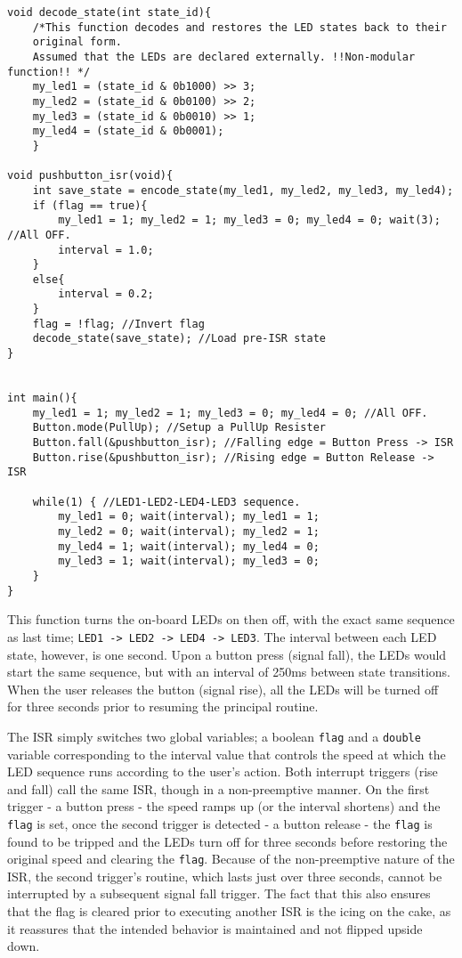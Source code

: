 \documentclass{article}
\begin{document}
\begin{verbatim}
void decode_state(int state_id){
    /*This function decodes and restores the LED states back to their
    original form.
    Assumed that the LEDs are declared externally. !!Non-modular function!! */
    my_led1 = (state_id & 0b1000) >> 3;
    my_led2 = (state_id & 0b0100) >> 2;
    my_led3 = (state_id & 0b0010) >> 1;
    my_led4 = (state_id & 0b0001);
    }

void pushbutton_isr(void){
    int save_state = encode_state(my_led1, my_led2, my_led3, my_led4);
    if (flag == true){
        my_led1 = 1; my_led2 = 1; my_led3 = 0; my_led4 = 0; wait(3); //All OFF.
        interval = 1.0;
    }
    else{
        interval = 0.2;
    }
    flag = !flag; //Invert flag
    decode_state(save_state); //Load pre-ISR state
}


int main(){
    my_led1 = 1; my_led2 = 1; my_led3 = 0; my_led4 = 0; //All OFF.
    Button.mode(PullUp); //Setup a PullUp Resister
    Button.fall(&pushbutton_isr); //Falling edge = Button Press -> ISR
    Button.rise(&pushbutton_isr); //Rising edge = Button Release -> ISR
    
    while(1) { //LED1-LED2-LED4-LED3 sequence.
        my_led1 = 0; wait(interval); my_led1 = 1;
        my_led2 = 0; wait(interval); my_led2 = 1;
        my_led4 = 1; wait(interval); my_led4 = 0;
        my_led3 = 1; wait(interval); my_led3 = 0;
    }
}
\end{verbatim}

This function turns the on-board LEDs on then off, with the exact same sequence as last time; \texttt{LED1 -> LED2 -> LED4 -> LED3}. The interval between each LED state, however, is one second. Upon a button press (signal fall), the LEDs would start the same sequence, but with an interval of 250ms between state transitions. When the user releases the button (signal rise), all the LEDs will be turned off for three seconds prior to resuming the principal routine.

The ISR simply switches two global variables; a boolean \texttt{flag} and a \texttt{double} variable corresponding to the interval value that controls the speed at which the LED sequence runs according to the user's action. Both interrupt triggers (rise and fall) call the same ISR, though in a non-preemptive manner. On the first trigger - a button press - the speed ramps up (or the interval shortens) and the \texttt{flag} is set, once the second trigger is detected - a button release - the \texttt{flag} is found to be tripped and the LEDs turn off for three seconds before restoring the original speed and clearing the \texttt{flag}. Because of the non-preemptive nature of the ISR, the second trigger's routine, which lasts just over three seconds, cannot be interrupted by a subsequent signal fall trigger. The fact that this also ensures that the flag is cleared prior to executing another ISR is the icing on the cake, as it reassures that the intended behavior is maintained and not flipped upside down.
\end{document}
